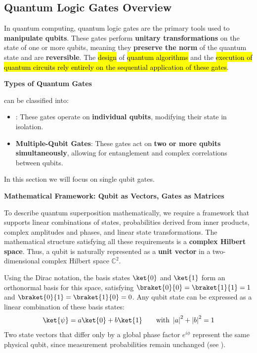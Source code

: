 \subsection{Quantum Logic Gates Overview}

In quantum computing, quantum logic gates are the primary tools used to \textbf{manipulate qubits}. These gates perform \textbf{unitary transformations} on the state of one or more qubits, meaning they \textbf{preserve the norm} of the quantum state and are \textbf{reversible}. The \hl{design} of \hl{quantum algorithms} and the \hl{execution of quantum circuits rely entirely on the sequential application of these gates}.

\highspace
\begin{flushleft}
    \textcolor{Green3}{ \textbf{Types of Quantum Gates}}
\end{flushleft}
 can be classified into:
\begin{itemize}
    \item {}: These gates operate on \textbf{individual qubits}, modifying their state in isolation.
    \item \textbf{Multiple-Qubit Gates}: These gates act on \textbf{two or more qubits simultaneously}, allowing for entanglement and complex correlations between qubits.
\end{itemize}
In this section we will focus on single qubit gates.

\highspace
\begin{flushleft}
    \textcolor{Green3}{ \textbf{Mathematical Framework: Qubit as Vectors, Gates as Matrices}}
\end{flushleft}
To describe quantum superposition mathematically, we require a framework that supports linear combinations of states, probabilities derived from inner products, complex amplitudes and phases, and linear state transformations. The mathematical structure satisfying all these requirements is a \textbf{complex Hilbert space}. Thus, a qubit is naturally represented as a \textbf{unit vector} in a two-dimensional complex Hilbert space $\mathbb{C}^{2}$.

\highspace
Using the Dirac notation, the basis states $\ket{0}$ and $\ket{1}$ form an orthonormal basis for this space, satisfying $\braket{0}{0} = \braket{1}{1} = 1$ and $\braket{0}{1} = \braket{1}{0} = 0$. Any qubit state can be expressed as a linear combination of these basis states:
\begin{equation*}
    \ket{\psi} = a\ket{0} + b\ket{1} \hspace{2em} \text{with } \left|a\right|^{2} + \left|b\right|^{2} = 1
\end{equation*}
Two state vectors that differ only by a global phase factor $e^{i\phi}$ represent the same physical qubit, since measurement probabilities remain unchanged (see ).

